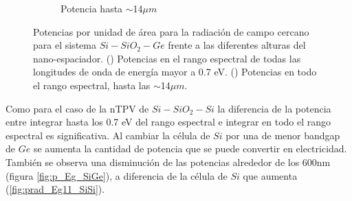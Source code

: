 \begin{figure}[H]
\begin{subfigure}[b]{0.49\textwidth}
	\caption{Potencia hasta $\sim$14$\mu m$}
	\label{fig:p_full_SiGe}
\end{subfigure}
	\caption[Potencias por unidad de área para la radiación de campo cercano para el sistema $Si-SiO_2-Ge$ frente a las diferentes alturas del nano-espaciador]{Potencias por unidad de área para la radiación de campo cercano para el sistema $Si-SiO_2-Ge$ frente a las diferentes alturas del nano-espaciador. () Potencias en el rango espectral de todas las longitudes de onda de energía mayor a 0.7 eV. () Potencias en todo el rango espectral, hasta las $\sim$14$\mu m$.}
	\label{fig:p_SiGe}
\end{figure}
Como para el caso de la nTPV de $Si-SiO_2-Si$ la diferencia de la potencia entre integrar hasta los 0.7 eV del rango espectral e integrar en todo el rango espectral es significativa. Al cambiar la célula de $Si$ por una de menor bandgap de $Ge$ se aumenta la cantidad de potencia que se puede convertir en electricidad. También se observa una disminución de las potencias alrededor de los 600nm (figura \ref{fig:p_Eg_SiGe}), a diferencia de la célula de $Si$ que aumenta (\ref{fig:prad_Eg11_SiSi}).
